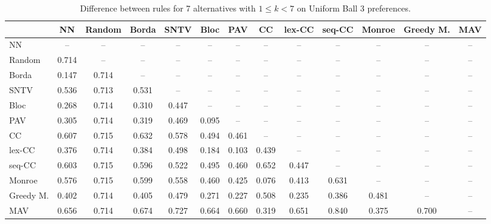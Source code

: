 
\begin{table*}[h!]
\centering
\begin{tabular}{lcccccccccccc}
\toprule
 & NN & Random & Borda & SNTV & Bloc & PAV & CC & lex-CC & seq-CC & Monroe & Greedy M. & MAV \\
\midrule
NN & -- & -- & -- & -- & -- & -- & -- & -- & -- & -- & -- & -- \\
Random & 0.714 & -- & -- & -- & -- & -- & -- & -- & -- & -- & -- & -- \\
Borda & 0.147 & 0.714 & -- & -- & -- & -- & -- & -- & -- & -- & -- & -- \\
SNTV & 0.536 & 0.713 & 0.531 & -- & -- & -- & -- & -- & -- & -- & -- & -- \\
Bloc & 0.268 & 0.714 & 0.310 & 0.447 & -- & -- & -- & -- & -- & -- & -- & -- \\
PAV & 0.305 & 0.714 & 0.319 & 0.469 & 0.095 & -- & -- & -- & -- & -- & -- & -- \\
CC & 0.607 & 0.715 & 0.632 & 0.578 & 0.494 & 0.461 & -- & -- & -- & -- & -- & -- \\
lex-CC & 0.376 & 0.714 & 0.384 & 0.498 & 0.184 & 0.103 & 0.439 & -- & -- & -- & -- & -- \\
seq-CC & 0.603 & 0.715 & 0.596 & 0.522 & 0.495 & 0.460 & 0.652 & 0.447 & -- & -- & -- & -- \\
Monroe & 0.576 & 0.715 & 0.599 & 0.558 & 0.460 & 0.425 & 0.076 & 0.413 & 0.631 & -- & -- & -- \\
Greedy M. & 0.402 & 0.714 & 0.405 & 0.479 & 0.271 & 0.227 & 0.508 & 0.235 & 0.386 & 0.481 & -- & -- \\
MAV & 0.656 & 0.714 & 0.674 & 0.727 & 0.664 & 0.660 & 0.319 & 0.651 & 0.840 & 0.375 & 0.700 & -- \\
\bottomrule
\end{tabular}

\caption{Difference between rules for 7 alternatives with $1 \leq k < 7$ on Uniform Ball 3 preferences.}
\end{table*}
